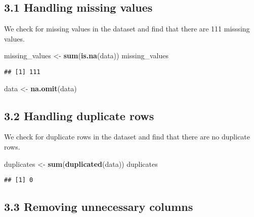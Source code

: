 \documentclass[
]{article}
\newenvironment{Shaded}{\begin{snugshade}}{\end{snugshade}}
\newcommand{\FunctionTok}[1]{\textcolor[rgb]{0.13,0.29,0.53}{\textbf{#1}}}
\newcommand{\NormalTok}[1]{#1}
\newcommand{\OtherTok}[1]{\textcolor[rgb]{0.56,0.35,0.01}{#1}}
\begin{document}
\hypertarget{handling-missing-values}{%
\subsection{3.1 Handling missing values}\label{handling-missing-values}}

We check for missing values in the dataset and find that there are 111
misssing values.

\begin{Shaded}
\begin{Highlighting}[]
\NormalTok{missing\_values }\OtherTok{\textless{}{-}} \FunctionTok{sum}\NormalTok{(}\FunctionTok{is.na}\NormalTok{(data))}
\NormalTok{missing\_values}
\end{Highlighting}
\end{Shaded}

\begin{verbatim}
## [1] 111
\end{verbatim}

\begin{Shaded}
\begin{Highlighting}[]
\NormalTok{data }\OtherTok{\textless{}{-}} \FunctionTok{na.omit}\NormalTok{(data)}
\end{Highlighting}
\end{Shaded}

\hypertarget{handling-duplicate-rows}{%
\subsection{3.2 Handling duplicate rows}\label{handling-duplicate-rows}}

We check for duplicate rows in the dataset and find that there are no
duplicate rows.

\begin{Shaded}
\begin{Highlighting}[]
\NormalTok{duplicates }\OtherTok{\textless{}{-}} \FunctionTok{sum}\NormalTok{(}\FunctionTok{duplicated}\NormalTok{(data))}
\NormalTok{duplicates}
\end{Highlighting}
\end{Shaded}

\begin{verbatim}
## [1] 0
\end{verbatim}

\hypertarget{removing-unnecessary-columns}{%
\subsection{3.3 Removing unnecessary
columns}\label{removing-unnecessary-columns}}
\end{document}
